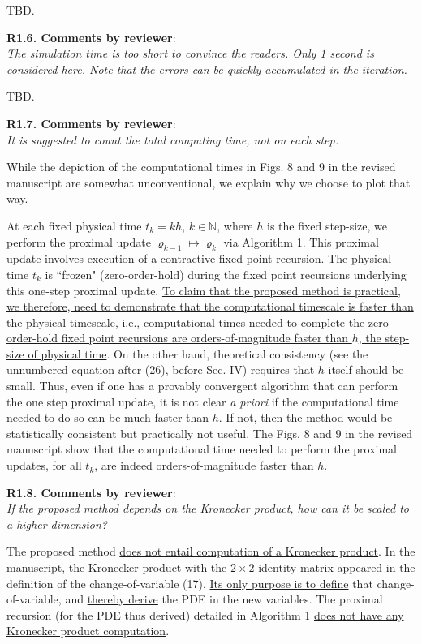 \documentclass[12pt,onecolumn]{IEEEtran}
\newcommand{\blue}{\color{blue}}
\newcommand{\nib}{\noindent  {\bf Response:} }
\begin{document}
{\nib{ \blue TBD.}}


\noindent
{\bf R1.6. Comments by reviewer}:\\
{\em The simulation time is too short to convince the readers. Only 1 second is considered here. Note that the errors can be quickly accumulated in the iteration.}

{\nib{ \blue TBD.}}


\noindent
{\bf R1.7. Comments by reviewer}:\\
{\em It is suggested to count the total computing time, not on each step.}

{\nib{ \blue While the depiction of the computational times in Figs. 8 and 9 in the revised manuscript are somewhat unconventional, we explain why we choose to plot that way. 

At each fixed physical time $t_{k}=kh$, $k\in\mathbb{N}$, where $h$ is the fixed step-size, we perform the proximal update $\varrho_{k-1}\mapsto\varrho_{k}$ via Algorithm 1. This proximal update involves execution of a contractive fixed point recursion. The physical time $t_{k}$ is ``frozen" (zero-order-hold) during the fixed point recursions underlying this one-step proximal update. \ul{To claim that the proposed method is practical, we therefore, need to demonstrate that the computational timescale is faster than the physical timescale, i.e., computational times needed to complete the zero-order-hold fixed point recursions are orders-of-magnitude faster than $h$, the step-size of physical time}. On the other hand, theoretical consistency (see the unnumbered equation after (26), before Sec. IV) requires that $h$ itself should be small. Thus, even if one has a provably convergent algorithm that can perform the one step proximal update, it is not clear \emph{a priori} if the computational time needed to do so can be much faster than $h$. If not, then the method would be statistically consistent but practically not useful. The Figs. 8 and 9 in the revised manuscript show that the computational time needed to perform the proximal updates, for all $t_{k}$, are indeed orders-of-magnitude faster than $h$.}}


\noindent
{\bf R1.8. Comments by reviewer}:\\
{\em If the proposed method depends on the Kronecker product, how can it be scaled to a higher dimension?}

{\nib{ \blue The proposed method \ul{does not entail computation of a Kronecker product}. In the manuscript, the Kronecker product with the $2\times 2$ identity matrix appeared in the definition of the change-of-variable (17). \ul{Its only purpose is to define} that change-of-variable, and \ul{thereby derive} the PDE in the new variables. The proximal recursion (for the PDE thus derived) detailed in Algorithm 1 \ul{does not have any Kronecker product computation}.}}
\end{document}
